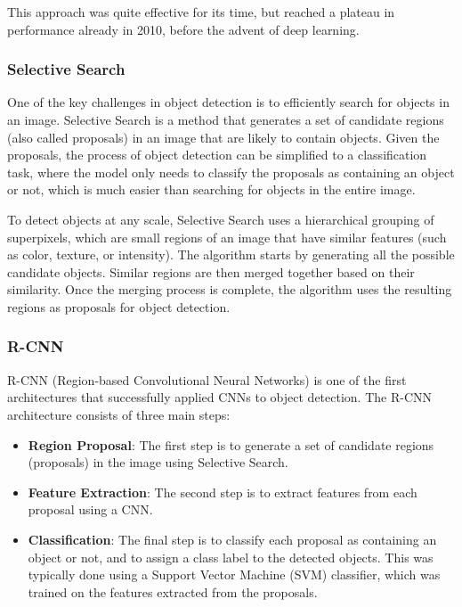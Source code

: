 This approach was quite effective for its time, but reached a plateau in performance already in 2010, before the advent of deep learning.

\subsubsection{Selective Search}
One of the key challenges in object detection is to efficiently search for objects in an image.
Selective Search is a method that generates a set of candidate regions (also called proposals) in an image
that are likely to contain objects. 
Given the proposals, the process of object detection can be simplified to a classification task, where the model only needs to classify the proposals as containing an object or not,
which is much easier than searching for objects in the entire image.

To detect objects at any scale, Selective Search uses a hierarchical grouping of superpixels, which are small regions of an image that 
have similar features (such as color, texture, or intensity).
The algorithm starts by generating all the possible candidate objects. Similar regions
are then merged together based on their similarity. 
Once the merging process is complete, the algorithm uses the resulting regions as proposals for object detection.

\subsubsection{R-CNN}
R-CNN (Region-based Convolutional Neural Networks) is one of the first architectures that successfully applied CNNs to object detection. 
The R-CNN architecture consists of three main steps:
\begin{itemize}
    \item \textbf{Region Proposal}: The first step is to generate a set of candidate regions (proposals) in the image using Selective Search.
    \item \textbf{Feature Extraction}: The second step is to extract features from each proposal using a CNN.
    \item \textbf{Classification}: The final step is to classify each proposal as containing an object or not, and to assign a class label to the detected objects.
    This was typically done using a Support Vector Machine (SVM) classifier, which was trained on the features extracted from the proposals.
\end{itemize}

